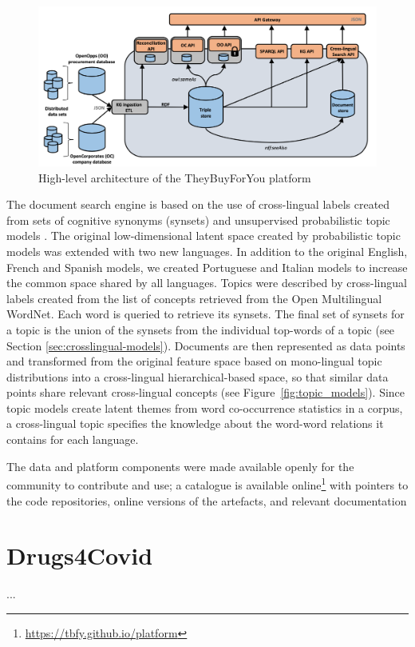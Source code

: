 \begin{figure}[ht]
    \centering
    \includegraphics[width=0.7\linewidth]{tbfy-architecture.png}
    \caption{High-level architecture of the TheyBuyForYou platform}
    \label{fig:tbfy-architecture}
\end{figure}

The document search engine is based on the use of cross-lingual labels created from sets of cognitive synonyms (synsets) and unsupervised probabilistic topic models \cite{Badenes-Olmedo2019a}. The original low-dimensional latent space created by probabilistic topic models was extended with two new languages. In addition to the original English, French and Spanish models, we created Portuguese and Italian models to increase the common space shared by all languages. Topics were described by cross-lingual labels created from the list of concepts retrieved from the Open Multilingual WordNet. Each word is queried to retrieve its synsets. The final set of synsets for a topic is the union of the synsets from the individual top-words of a topic (see Section \ref{sec:crosslingual-models}). Documents are then represented as data points and transformed from the original feature space based on mono-lingual topic distributions into a cross-lingual hierarchical-based space, so that similar data points share relevant cross-lingual concepts (see Figure~\ref{fig:topic_models}). Since topic models create latent themes from word co-occurrence statistics in a corpus, a cross-lingual topic specifies the knowledge about the word-word relations it contains for each language. 

The data and platform components were made available openly for the community to contribute and use; a catalogue is available online\footnote{\url{https://tbfy.github.io/platform}} with pointers to the code repositories, online versions of the artefacts, and relevant documentation


\section{Drugs4Covid}
\label{sec:drugs4covid}
...